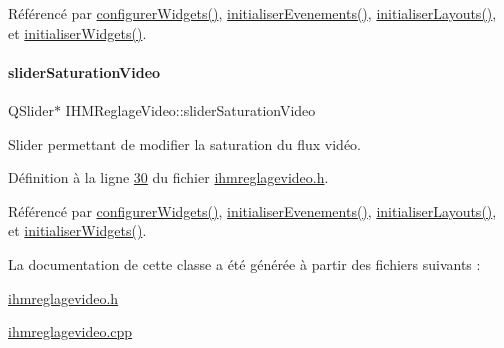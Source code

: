 Référencé par \hyperlink{ihmreglagevideo_8cpp_source_l00047}{configurer\+Widgets()}, \hyperlink{ihmreglagevideo_8cpp_source_l00105}{initialiser\+Evenements()}, \hyperlink{ihmreglagevideo_8cpp_source_l00061}{initialiser\+Layouts()}, et \hyperlink{ihmreglagevideo_8cpp_source_l00023}{initialiser\+Widgets()}.

\mbox{\label{class_i_h_m_reglage_video_aba60de0eccec35f165101b10c0cd33df}} 
\paragraph{\texorpdfstring{slider\+Saturation\+Video}{sliderSaturationVideo}}
{\footnotesize\ttfamily Q\+Slider$\ast$ I\+H\+M\+Reglage\+Video\+::slider\+Saturation\+Video\hspace{0.3cm}{\ttfamily [private]}}



Slider permettant de modifier la saturation du flux vidéo. 



Définition à la ligne \hyperlink{ihmreglagevideo_8h_source_l00030}{30} du fichier \hyperlink{ihmreglagevideo_8h_source}{ihmreglagevideo.\+h}.



Référencé par \hyperlink{ihmreglagevideo_8cpp_source_l00047}{configurer\+Widgets()}, \hyperlink{ihmreglagevideo_8cpp_source_l00105}{initialiser\+Evenements()}, \hyperlink{ihmreglagevideo_8cpp_source_l00061}{initialiser\+Layouts()}, et \hyperlink{ihmreglagevideo_8cpp_source_l00023}{initialiser\+Widgets()}.



La documentation de cette classe a été générée à partir des fichiers suivants \+:\begin{DoxyCompactItemize}
\item 
\hyperlink{ihmreglagevideo_8h}{ihmreglagevideo.\+h}\item 
\hyperlink{ihmreglagevideo_8cpp}{ihmreglagevideo.\+cpp}\end{DoxyCompactItemize}
